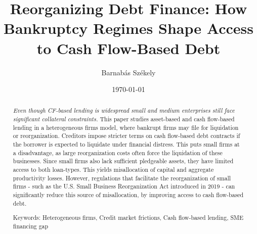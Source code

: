 \documentclass[12pt]{article}
\title{Reorganizing Debt Finance: How Bankruptcy Regimes Shape Access to Cash Flow-Based Debt}
\date{}
\begin{document}
\author{Barnabás Székely}
\date{\today}
\vspace{-1in}

\maketitle

\begin{abstract}
\noindent

\textit{Even though CF-based lending is widespread small and medium enterprises still face significant collateral constraints.} This paper studies asset-based and cash flow-based lending in a heterogeneous firms model, where bankrupt firms may file for liquidation or reorganization. Creditors impose stricter terms on cash flow-based debt contracts if the borrower is expected to liquidate under financial distress. This puts small firms at a disadvantage, as large reorganization costs often force the liquidation of these businesses. Since small firms also lack sufficient pledgeable assets, they have limited access to both loan-types. This yields misallocation of capital and aggregate productivity losses. However, regulations that facilitate the reorganization of small firms - such as the  U.S. Small Business Reorganization Act introduced in 2019 - can significantly reduce this source of misallocation, by improving access to cash flow-based debt.

\bigskip{}
\bigskip{}

Keywords: Heterogeneous firms, Credit market frictions, Cash flow-based lending, SME financing gap
\medskip{}
\end{abstract}
\thispagestyle{empty}

\pagebreak{}
\end{document}
